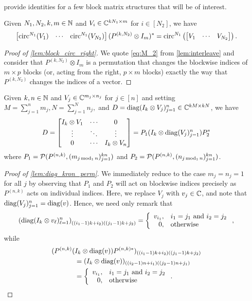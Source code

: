  provide identities for a few block matrix structures that will be of interest.
\begin{lemma}\label{lem:block_circ_right}
  Given $N_1, N_2, k, m \in \mathbb{N}$ and $V_i \in \mathbb{C}^{k N_1 \times m}$ for $i \in [N_2]$, we have \[\begin{bmatrix} \operatorname{circ}^{N_1}(V_1) & \cdots & \operatorname{circ}^{N_1}(V_{N_2}) \end{bmatrix} (P^{(k, N_2)} \otimes I_m)^* = \operatorname{circ}^{N_1}\left(\begin{bmatrix} V_1 & \cdots & V_{N_2}\end{bmatrix}\right).\]
\end{lemma}

\begin{proof}[Proof of \cref{lem:block_circ_right}]
  We quote \eqref{eq:M_2} from \cref{lem:interleave} and consider that $P^{(k, N_2)} \otimes I_m$ is a permutation that changes the blockwise indices of $m \times p$ blocks (or, acting from the right, $p \times m$ blocks) exactly the way that $P^{(k, N_2)}$ changes the indices of a vector.
\end{proof}

\begin{lemma} \label{lem:diag_kron_perm}
  Given $k, n \in \mathbb{N}$ and $V_j \in \mathbb{C}^{m_j \times n_j}$ for $j \in [n]$ and setting $M = \sum_{j = 1}^n m_j, N = \sum_{j = 1}^N n_j,$ and $D = \operatorname{diag}(I_k \otimes V_j)_{j = 1}^n \in \mathbb{C}^{k M \times k N}$, we have \[D =  \begin{bmatrix} I_k \otimes V_1 & \cdots & 0 \\ \vdots & \ddots & \vdots \\ 0 & \cdots & I_k \otimes V_n \end{bmatrix}  = P_1 (I_k \otimes \operatorname{diag}(V_j)_{j = 1}^n) P_2^*\] where $P_1 = \mathcal{P}(P^{(n, k)}, (m_{j \operatorname{\mathbin{mod}}_1 n})_{j = 1}^{kn})$ and $P_2 = \mathcal{P}(P^{(n, k)}, (n_{j \operatorname{\mathbin{mod}}_1 n})_{j = 1}^{kn})$.
\end{lemma}

\begin{proof}[Proof of \cref{lem:diag_kron_perm}]
  We immediately reduce to the case $m_j = n_j = 1$ for all $j$ by observing that $P_1$ and $P_2$ will act on blockwise indices precisely as $P^{(n, k)}$ acts on individual indices.  Here, we replace $V_j$ with $v_j \in \mathbb{C}$, and note that $\operatorname{diag}(V_j)_{j = 1}^n = \operatorname{diag}(v)$.  Hence, we need only remark that \[\left(\diag(I_k \otimes v_\ell)_{\ell = 1}^n\right)_{((i_1 - 1)k + i_2) ((j_1 - 1)k + j_2)} = \left\{\begin{array}{r@{,\quad}l} v_{i_1} & i_1 = j_1 \ \text{and} \ i_2 = j_2 \\ 0 & \text{otherwise} \end{array}\right.,\] while \begin{align*} (P^{(n, k)} (&I_k \otimes \diag(v)) P^{(n, k)*})_{((i_1 - 1)k + i_2) ((j_1 - 1)k + j_2)} \\ &= (I_k \otimes \diag(v))_{((i_2 - 1)n + i_1) ((j_2 - 1)n + j_1)} \\ &= \left\{\begin{array}{r@{,\quad}l} v_{i_1} & i_1 = j_1 \ \text{and} \ i_2 = j_2 \\ 0 & \text{otherwise} \end{array}\right..\end{align*}
\end{proof}

